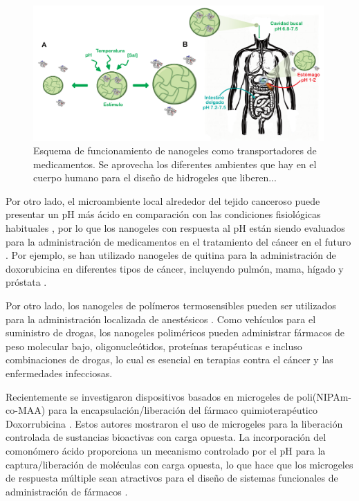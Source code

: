 \begin{figure}
	\centering
	\includegraphics[width=0.99\textwidth]{Figures/modelos/sistema.pdf}
	\caption{Esquema de funcionamiento de nanogeles como transportadores de medicamentos. Se aprovecha los diferentes ambientes que hay en el cuerpo humano para el dise\~no de hidrogeles que liberen... }
	\label{fig:intro:sistema}
\end{figure}

Por otro lado, el microambiente local alrededor del tejido canceroso puede presentar un pH m\'as \'acido en comparaci\'on con las condiciones fisiol\'ogicas habituales \cite{lawson1963breast,tannock1989acid,gerweck2006tumor}, por lo que los nanogeles con respuesta al pH est\'an siendo evaluados para la administraci\'on de medicamentos en el tratamiento del c\'ancer en el futuro \cite{peng2013controlled,kanamala2016mechanisms}. Por ejemplo, se han utilizado nanogeles de quitina para la administraci\'on de doxorubicina en diferentes tipos de c\'ancer, incluyendo pulm\'on, mama, h\'igado y pr\'ostata \cite{jayakumar2012doxorubicin}.

Por otro lado, los nanogeles de pol\'imeros termosensibles pueden ser utilizados para la administraci\'on localizada de anest\'esicos \cite{srivastava2014thermoresponsive} . Como veh\'iculos para el suministro de drogas, los nanogeles polim\'ericos pueden administrar f\'armacos de peso molecular bajo, oligonucle\'otidos, prote\'inas terap\'euticas e incluso combinaciones de drogas, lo cual es esencial en terapias contra el c\'ancer y las enfermedades infecciosas.

Recientemente se investigaron dispositivos basados en microgeles de poli(NIPAm-co-MAA) para la encapsulaci\'on/liberaci\'on del f\'armaco quimioterap\'eutico Doxorrubicina \cite{Giussi2020, MartinezMoro2020, Pergushov2020}. Estos autores mostraron el uso de microgeles para la liberaci\'on controlada de sustancias bioactivas con carga opuesta.
La incorporaci\'on del comon\'omero \'acido proporciona un mecanismo controlado por el pH para la captura/liberaci\'on de mol\'eculas con carga opuesta, lo que hace que los microgeles de respuesta múltiple sean atractivos para el dise\~no de sistemas funcionales de administraci\'on de f\'armacos \cite{Liu2017}.

